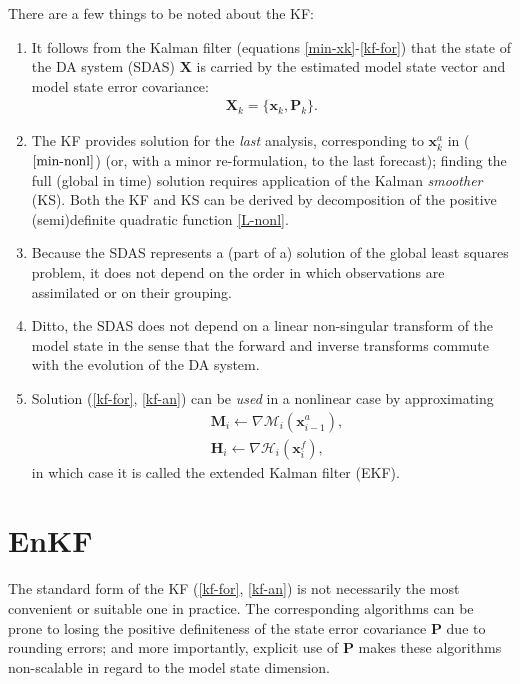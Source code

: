 \documentclass[11pt]{report}
\newcommand{\mb} {\mathbf}
\begin{document}
There are a few things to be noted about the KF:
\vspace{-3mm}
\begin{enumerate}
\item It follows from the Kalman filter (equations \ref{min-xk}-\ref{kf-for}) that the state of the DA system (SDAS) $\mb X$ is carried by the estimated model state vector and model state error covariance:
\begin{align}
  \label{sdas}
  \mb X_k = \{\mb x_k, \mb P_k\}.
\end{align}
\item The KF provides solution for the \emph{last} analysis, corresponding to $\mb x_k^a$ in ($\ref{min-nonl}$) (or, with a minor re-formulation, to the last forecast); finding the full (global in time) solution requires application of the Kalman \emph{smoother} (KS).
Both the KF and KS can be derived by decomposition of the positive (semi)definite quadratic function \eqref{L-nonl}.
\item Because the SDAS represents a (part of a) solution of the global least squares problem, it does not depend on the order in which observations are assimilated or on their grouping.
\item Ditto, the SDAS does not depend on a linear non-singular transform of the model state in the sense that the forward and inverse transforms commute with the evolution of the DA system.
\item Solution (\ref{kf-for}, \ref{kf-an}) can be \emph{used} in a nonlinear case by approximating
\begin{align*}
  &\mb M_{i} \leftarrow \nabla \mathcal M_i(\mb x_{i-1}^a),\\
  &\mb H_{i} \leftarrow \nabla \mathcal H_i(\mb x_i^f),
\end{align*}
in which case it is called the extended Kalman filter (EKF).
\end{enumerate}

\section{EnKF}

The standard form of the KF (\ref{kf-for}, \ref{kf-an}) is not necessarily the most convenient or suitable one in practice.
The corresponding algorithms can be prone to losing the positive definiteness of the state error covariance $\mb P$ due to rounding errors; and more importantly, explicit use of $\mb P$ makes these algorithms non-scalable in regard to the model state dimension.
\end{document}
